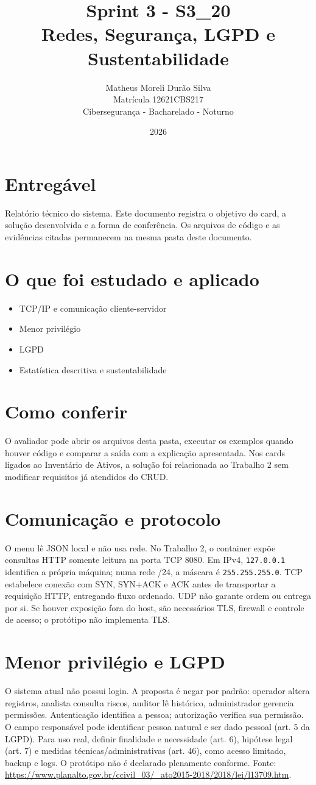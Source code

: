 \documentclass[12pt]{article}
\title{Sprint 3 - S3\_20\\Redes, Segurança, LGPD e Sustentabilidade}
\author{Matheus Moreli Durão Silva\\Matrícula 12621CBS217\\Cibersegurança - Bacharelado - Noturno}
\date{2026}
\begin{document}
\maketitle

\section*{Entregável}
Relatório técnico do sistema. Este documento registra o objetivo do card, a solução desenvolvida e a forma de conferência. Os arquivos de código e as evidências citadas permanecem na mesma pasta deste documento.

\section*{O que foi estudado e aplicado}
\begin{itemize}
\item TCP/IP e comunicação cliente-servidor
\item Menor privilégio
\item LGPD
\item Estatística descritiva e sustentabilidade
\end{itemize}

\section*{Como conferir}
O avaliador pode abrir os arquivos desta pasta, executar os exemplos quando houver código e comparar a saída com a explicação apresentada. Nos cards ligados ao Inventário de Ativos, a solução foi relacionada ao Trabalho 2 sem modificar requisitos já atendidos do CRUD.

\section*{Comunicação e protocolo}
O menu lê JSON local e não usa rede. No Trabalho 2, o container expõe consultas HTTP somente leitura na porta TCP 8080. Em IPv4, \texttt{127.0.0.1} identifica a própria máquina; numa rede /24, a máscara é \texttt{255.255.255.0}. TCP estabelece conexão com SYN, SYN+ACK e ACK antes de transportar a requisição HTTP, entregando fluxo ordenado. UDP não garante ordem ou entrega por si. Se houver exposição fora do host, são necessários TLS, firewall e controle de acesso; o protótipo não implementa TLS.
\section*{Menor privilégio e LGPD}
O sistema atual não possui login. A proposta é negar por padrão: operador altera registros, analista consulta riscos, auditor lê histórico, administrador gerencia permissões. Autenticação identifica a pessoa; autorização verifica sua permissão. O campo responsável pode identificar pessoa natural e ser dado pessoal (art. 5 da LGPD). Para uso real, definir finalidade e necessidade (art. 6), hipótese legal (art. 7) e medidas técnicas/administrativas (art. 46), como acesso limitado, backup e logs. O protótipo não é declarado plenamente conforme. Fonte: \url{https://www.planalto.gov.br/ccivil_03/_ato2015-2018/2018/lei/l13709.htm}.
\end{document}
